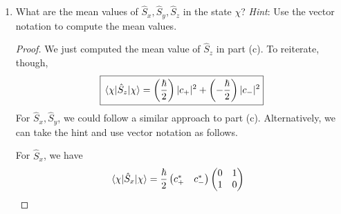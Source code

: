 \documentclass[../psets.tex]{subfiles}
\begin{document}
\begin{enumerate}
\begin{enumerate}
\begin{proof}
            \begin{align*}
                \ev{\hat{S}_z}{\chi} &= (c_+^*\bra{\tfrac{1}{2},\tfrac{1}{2}}+c_-^*\bra{\tfrac{1}{2},-\tfrac{1}{2}})\hat{S}_z(c_+\ket{\tfrac{1}{2},\tfrac{1}{2}}+c_-\ket{\tfrac{1}{2},-\tfrac{1}{2}})\\
                &= (c_+^*\bra{\tfrac{1}{2},\tfrac{1}{2}}+c_-^*\bra{\tfrac{1}{2},-\tfrac{1}{2}})\frac{\hbar}{2}(c_+\ket{\tfrac{1}{2},\tfrac{1}{2}}-c_-\ket{\tfrac{1}{2},-\tfrac{1}{2}})\\
                &= \left( \frac{\hbar}{2} \right)|c_+|^2+\left( -\frac{\hbar}{2} \right)|c_-|^2
            \end{align*}
            Thus, the expected value of $\hat{S}_z$ is a weighted average of $\pm\hbar/2$. More specifically, we can expect to measure a value of $\hbar/2$ (for instance) every $|c_+|^2/1$ times. In other words, the probability of measuring a value of $\hat{S}_z=\hbar/2$ is
            \begin{equation*}
                \boxed{|c_+|^2}
            \end{equation*}
        \end{proof}
        \item What are the mean values of $\hat{S}_x,\hat{S}_y,\hat{S}_z$ in the state $\chi$? \emph{Hint}: Use the vector notation to compute the mean values.
        \begin{proof}
            We just computed the mean value of $\hat{S}_z$ in part (c). To reiterate, though,
            \begin{equation*}
                \boxed{\ev{\hat{S}_z}{\chi} = \left( \frac{\hbar}{2} \right)|c_+|^2+\left( -\frac{\hbar}{2} \right)|c_-|^2}
            \end{equation*}
            For $\hat{S}_x,\hat{S}_y$, we could follow a similar approach to part (c). Alternatively, we can take the hint and use vector notation as follows.\par
            For $\hat{S}_x$, we have
            \begin{align*}
                \ev{\hat{S}_x}{\chi} &= \frac{\hbar}{2}
                \begin{pmatrix}
                    c_+^* & c_-^*\\
                \end{pmatrix}
                \begin{pmatrix}
                    0 & 1\\
                    1 & 0\\

\end{pmatrix}
\end{align*}
\end{proof}
\end{enumerate}
\end{enumerate}
\end{document}
